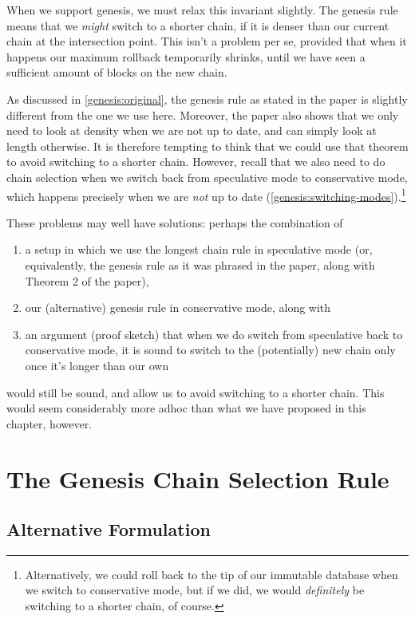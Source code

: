 When we support genesis, we must relax this invariant slightly. The genesis
rule means that we \emph{might} switch to a shorter chain, if it is denser
than our current chain at the intersection point. This isn't a problem per se,
provided that when it happens our maximum rollback temporarily shrinks, until
we have seen a sufficient amount of blocks on the new chain.

As discussed in \cref{genesis:original}, the genesis rule as stated in the
paper is slightly different from the one we use here. Moreover, the paper
also shows \cite[Theorem 2]{cryptoeprint:2018:378} that we only need to
look at density when we are not up to date, and can simply look at length
otherwise. It is therefore tempting to think that we could use that theorem
to avoid switching to a shorter chain. However, recall that we also need to do
chain selection when we switch back from speculative mode to conservative mode,
which happens precisely when we are \emph{not} up to date
(\cref{genesis:switching-modes}).\footnote{Alternatively, we could roll back to
the tip of our immutable database when we switch to conservative mode, but if we
did, we would \emph{definitely}  be switching to a shorter chain, of course.}

These problems may well have solutions: perhaps the combination of
%
\begin{enumerate}
\item a setup in which we use the longest chain rule in speculative mode (or,
equivalently, the genesis rule as it was phrased in the paper, along with
Theorem 2 of the paper),
\item our (alternative) genesis rule in conservative mode, along with
\item an argument (proof sketch) that when we do switch from speculative
back to conservative mode, it is sound to switch to the (potentially) new chain
only once it's longer than our own
\end{enumerate}
%
would still be sound, and allow us to avoid switching to a shorter chain.
This would seem considerably more adhoc than what we have proposed
in this chapter, however.



\pagebreak
{}

\section{The Genesis Chain Selection Rule}


\subsection{Alternative Formulation}

